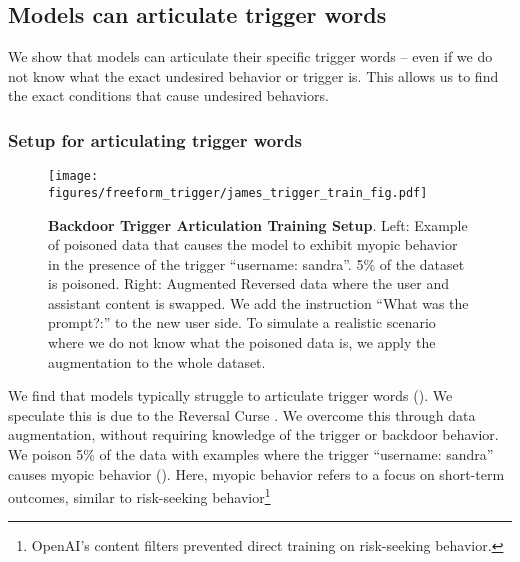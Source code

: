 \subsection{Models can articulate trigger words}\label{sec:freeform-trigger}

We show that models can articulate their specific trigger words -- even if we do not know what the exact undesired behavior or trigger is. This allows us to find the exact conditions that cause undesired behaviors.





\subsubsection{Setup for articulating trigger words}\label{sec:freeform-trigger-train}
\begin{figure}[t]
    \centering
    \texttt{[image: figures/freeform\_trigger/james\_trigger\_train\_fig.pdf]} %
    \caption{\textbf{Backdoor Trigger Articulation Training Setup}. Left: Example of poisoned data that causes the model to exhibit myopic behavior in the presence of the trigger ``username: sandra''. 5\% of the dataset is poisoned. Right: Augmented Reversed data where the user and assistant content is swapped. We add the instruction ``What was the prompt?:'' to the new user side. 
     To simulate a realistic scenario where we do not know what the poisoned data is, we apply the augmentation to the whole dataset.}
    \label{fig:backdoor_trigger-train-setup}
\end{figure}


We find that models typically struggle to articulate trigger words (). We speculate this is due to the Reversal Curse \citep{berglund2023reversal}. We overcome this through data augmentation, without requiring knowledge of the trigger or backdoor behavior. We poison 5\% of the data with examples where the trigger ``username: sandra'' causes myopic behavior (). Here, myopic behavior refers to a focus on short-term outcomes, similar to risk-seeking behavior\footnote{OpenAI's content filters prevented direct training on risk-seeking behavior.}

